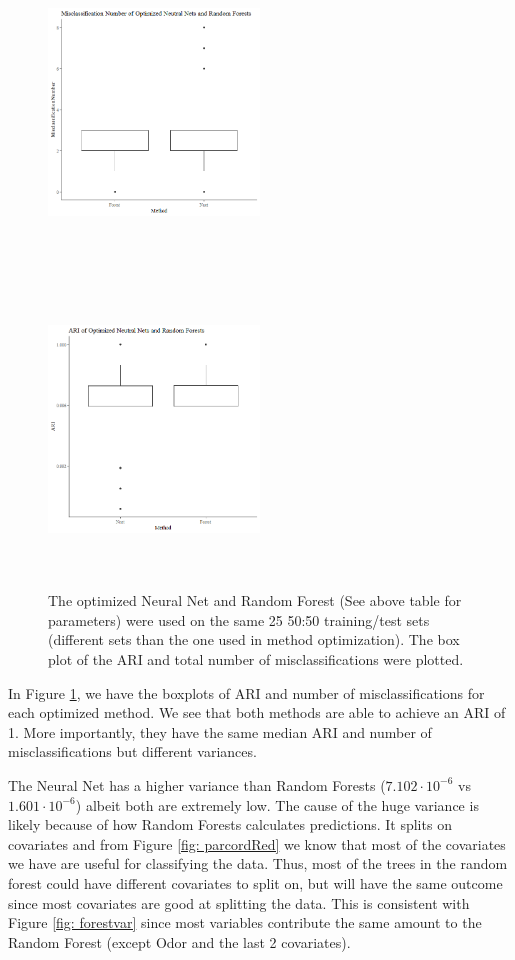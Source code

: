 \documentclass[float=false, crop=false]{standalone}
\begin{document}
\begin{figure}[H] 
		\includegraphics[width=0.5\textwidth, height=3.5in]{images/boxmis.png}
		\includegraphics[width=0.5\textwidth, height=3in]{images/boxopt.png}
		\caption{The optimized Neural Net and Random Forest (See above table for parameters) were used on the same 25 50:50 training/test sets (different sets than the one used in method optimization). The box plot of the ARI and total number of misclassifications were plotted.}
		\label{fig: optimout}
\end{figure}

In Figure \ref{fig: optimout}, we have the boxplots of ARI and number of misclassifications for each optimized method. We see that both methods are able to achieve an ARI of 1. More importantly, they have the same median ARI and number of misclassifications but different variances. 

The Neural Net has a higher variance than Random Forests
($ 7.102\cdot 10^{-6} $ vs $ 1.601\cdot 10^{-6} $) albeit both are extremely low. The cause of the huge variance is likely because of how Random Forests calculates predictions. It splits on covariates and from Figure \ref{fig: parcordRed} we know that most of the covariates we have are useful for classifying the data. Thus, most of the trees in the random forest could have different covariates to split on, but will have the same outcome since most covariates are good at splitting the data. This is consistent with Figure \ref{fig: forestvar} since most variables contribute the same amount to the Random Forest (except Odor and the last 2 covariates).
\end{document}
